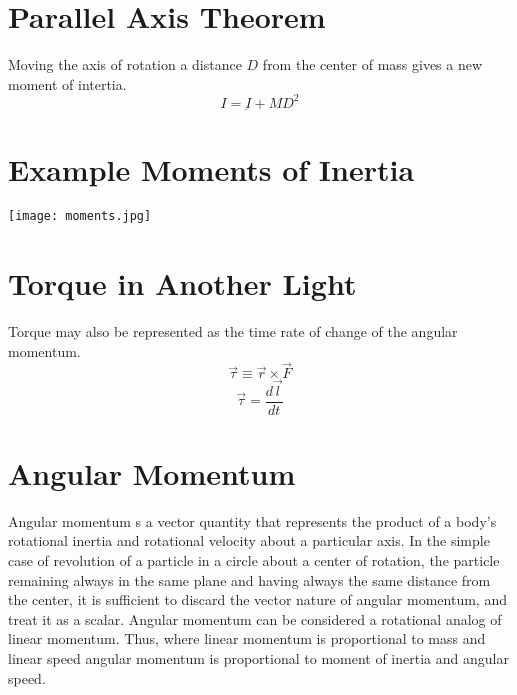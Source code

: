  \section{Parallel Axis Theorem}
 Moving the axis of rotation a distance $D$ from the center of mass gives a new moment of intertia.
 \vspace{0.1cm}
 $$ I= \underbar{I}+MD^2$$
 
 \newpage
 
 \section{Example Moments of Inertia}
  \vspace{1cm}
  
 \begin{center}
\texttt{[image: moments.jpg]}

\end{center}
 
 \section{Torque in Another Light}
 Torque may also be represented as the time rate of change of the angular momentum.
  $$\overrightarrow{\tau}\equiv \overrightarrow{r}\times  \overrightarrow{F}$$
  $$\overrightarrow{\tau}=\frac{d \overrightarrow{l}}{dt}$$
  
\section{Angular Momentum}
Angular momentum s a vector quantity that represents the product of a body's rotational inertia and rotational velocity about a particular axis. In the simple case of revolution of a particle in a circle about a center of rotation, the particle remaining always in the same plane and having always the same distance from the center, it is sufficient to discard the vector nature of angular momentum, and treat it as a scalar.  Angular momentum can be considered a rotational analog of linear momentum. Thus, where linear momentum is proportional to mass and linear speed angular momentum is proportional to moment of inertia and angular speed.

